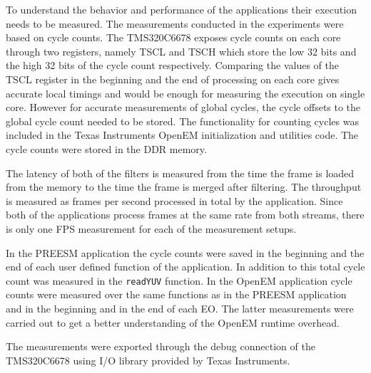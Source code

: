 To understand the behavior and performance of the applications their execution needs to be measured. The measurements conducted in the experiments were based on cycle counts. The TMS320C6678 exposes cycle counts on each core through two registers, namely TSCL and TSCH which store the low 32 bits and the high 32 bits of the cycle count respectively. Comparing the values of the TSCL register in the beginning and the end of processing on each core gives accurate local timings and would be enough for measuring the execution on single core. However for accurate measurements of global cycles, the cycle offsets to the global cycle count needed to be stored. The functionality for counting cycles was included in the Texas Instruments OpenEM initialization and utilities code. The cycle counts were stored in the DDR memory.

The latency of both of the filters is measured from the time the frame is loaded from the memory to the time the frame is merged after filtering. The throughput is measured as frames per second processed in total by the application. Since both of the applications process frames at the same rate from both streams, there is only one FPS measurement for each of the measurement setups.

In the PREESM application the cycle counts were saved in the beginning and the end of each user defined function of the application. In addition to this total cycle count was measured in the \texttt{readYUV} function. In the OpenEM application cycle counts were measured over the same functions as in the PREESM application and in the beginning and in the end of each EO. The latter measurements were carried out to get a better understanding of the OpenEM runtime overhead.

The measurements were exported through the debug connection of the TMS320C6678 using I/O library provided by Texas Instruments.
